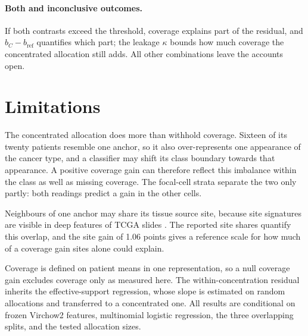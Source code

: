 \documentclass[11pt]{article}
\begin{document}
\paragraph{Both and inconclusive outcomes.}
If both contrasts exceed the threshold, coverage explains part of the residual, and $b_C-b_{\mathrm{ref}}$ quantifies which part; the leakage $\kappa$ bounds how much coverage the concentrated allocation still adds. All other combinations leave the accounts open.



\section{Limitations}
\label{sec:limitations}
The concentrated allocation does more than withhold coverage. Sixteen of its twenty patients resemble one anchor, so it also over-represents one appearance of the cancer type, and a classifier may shift its class boundary towards that appearance. A positive coverage gain can therefore reflect this imbalance within the class as well as missing coverage. The focal-cell strata separate the two only partly: both readings predict a gain in the other cells.

Neighbours of one anchor may share its tissue source site, because site signatures are visible in deep features of TCGA slides \citep{howard2021impact}. The reported site shares quantify this overlap, and the site gain of 1.06 points \citep{queisler2026siteCoverage} gives a reference scale for how much of a coverage gain sites alone could explain.

Coverage is defined on patient means in one representation, so a null coverage gain excludes coverage only as measured here. The within-concentration residual inherits the effective-support regression, whose slope is estimated on random allocations and transferred to a concentrated one. All results are conditional on frozen Virchow2 features, multinomial logistic regression, the three overlapping splits, and the tested allocation sizes.



\end{document}
